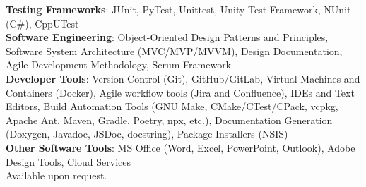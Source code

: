 \textbf{Testing Frameworks}: JUnit, PyTest, 
Unittest, Unity Test Framework, NUnit (C\#), CppUTest\\
\textbf{Software Engineering}: 
Object-Oriented Design Patterns and Principles, 
Software System Architecture (MVC/MVP/MVVM), Design Documentation, 
Agile Development Methodology, Scrum Framework\\
\textbf{Developer Tools}: Version Control (Git), GitHub/GitLab, 
Virtual Machines and Containers (Docker), 
Agile workflow tools (Jira and Confluence), 
IDEs and Text Editors, 
Build Automation Tools (GNU Make, CMake/CTest/CPack, vcpkg, 
Apache Ant, Maven, Gradle, Poetry, npx, etc.), 
Documentation Generation (Doxygen, Javadoc, JSDoc, docstring), 
Package Installers (NSIS)\\
\textbf{Other Software Tools}: MS Office (Word, Excel, PowerPoint, Outlook), 
Adobe Design Tools, Cloud Services\\

Available upon request.



